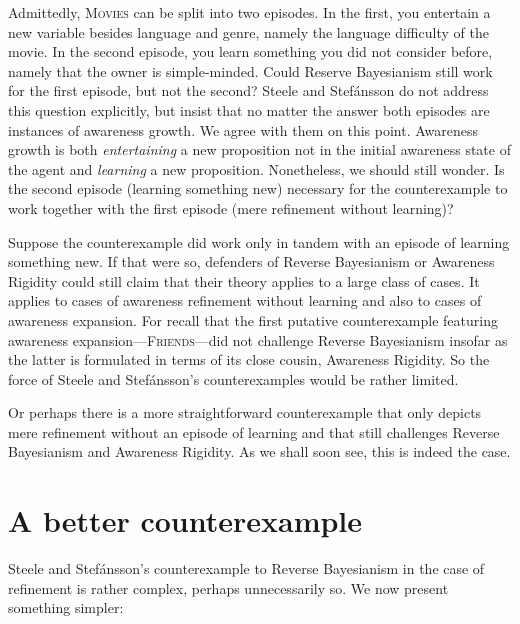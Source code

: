 \documentclass[
  11pt,
  dvipsnames,enabledeprecatedfontcommands]{scrartcl}
\begin{document}
\noindent  Admittedly, \textsc{Movies} can be split into two episodes.
In the first, you entertain a new variable besides language and genre,
namely the language difficulty of the movie. In the second episode, you
learn something you did not consider before, namely that the owner is
simple-minded. Could Reserve Bayesianism still work for the first
episode, but not the second? Steele and Stefánsson do not address this
question explicitly, but insist that no matter the answer both episodes
are instances of awareness growth. We agree with them on this point.
Awareness growth is both \textit{entertaining} a new proposition not in
the initial awareness state of the agent and \textit{learning} a new
proposition. Nonetheless, we should still wonder. Is the second episode
(learning something new) necessary for the counterexample to work
together with the first episode (mere refinement without learning)?

Suppose the counterexample did work only in tandem with an episode of
learning something new. If that were so, defenders of Reverse
Bayesianism or Awareness Rigidity could still claim that their theory
applies to a large class of cases. It applies to cases of awareness
refinement without learning and also to cases of awareness expansion.
For recall that the first putative counterexample featuring awareness
expansion---\textsc{Friends}---did not challenge Reverse Bayesianism
insofar as the latter is formulated in terms of its close cousin,
Awareness Rigidity. So the force of Steele and Stefánsson's
counterexamples would be rather limited.

Or perhaps there is a more straightforward counterexample that only
depicts mere refinement without an episode of learning and that still
challenges Reverse Bayesianism and Awareness Rigidity. As we shall soon
see, this is indeed the case.

\hypertarget{a-better-counterexample}{%
\section{A better counterexample}\label{a-better-counterexample}}

\label{sec:better}

Steele and Stefánsson's counterexample to Reverse Bayesianism in the
case of refinement is rather complex, perhaps unnecessarily so. We now
present something simpler:
\end{document}
